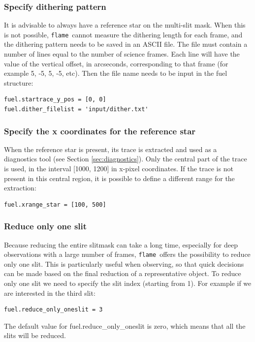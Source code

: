 \documentclass[a4paper, notitlepage]{article}
\newcommand{\flame}{\texttt{flame}}
\begin{document}
\subsubsection{Specify dithering pattern}

It is advisable to always have a reference star on the multi-slit mask. When this is not possible, \flame\ cannot measure the dithering length for each frame, and the dithering pattern needs to be saved in an ASCII file. The file must contain a number of lines equal to the number of science frames. Each line will have the value of the vertical offset, in arcseconds, corresponding to that frame (for example 5, -5, 5, -5, etc). Then the file name needs to be input in the fuel structure:
\begin{lstlisting}
fuel.startrace_y_pos = [0, 0]
fuel.dither_filelist = 'input/dither.txt'
\end{lstlisting}


\subsubsection{Specify the x coordinates for the reference star}

When the reference star is present, its trace is extracted and used as a diagnostics tool (see Section \ref{sec:diagnostics}). Only the central part of the trace is used, in the interval [1000, 1200] in x-pixel coordinates. If the trace is not present in this central region, it is possible to define a different range for the extraction:
\begin{lstlisting}
fuel.xrange_star = [100, 500]
\end{lstlisting}



\subsubsection{Reduce only one slit}

Because reducing the entire slitmask can take a long time, especially for deep observations with a large number of frames, \flame\ offers the possibility to reduce only one slit. This is particularly useful when observing, so that quick decisions can be made based on the final reduction of a representative object. To reduce only one slit we need to specify the slit index (starting from 1). For example if we are interested in the third slit:
\begin{lstlisting}
fuel.reduce_only_oneslit = 3
\end{lstlisting}
The default value for fuel.reduce\_only\_oneslit is zero, which means that all the slits will be reduced.
\end{document}
